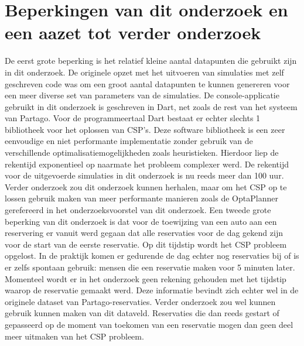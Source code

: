 \section{Beperkingen van dit onderzoek en een aazet tot verder onderzoek} \label{beperkingen-onderzoek}
De eerst grote beperking is het relatief kleine aantal datapunten die gebruikt zijn in dit onderzoek. De originele opzet met het uitvoeren van simulaties met zelf geschreven code was om een groot aantal datapunten te kunnen genereren voor een meer diverse set van parameters van de simulaties. De console-applicatie gebruikt in dit onderzoek is geschreven in Dart, net zoals de rest van het systeem van Partago. Voor de programmeertaal Dart bestaat er echter slechts 1 bibliotheek voor het oplossen van CSP's. Deze software bibliotheek is een zeer eenvoudige en niet performante implementatie zonder gebruik van de verschillende optimalisatiemogelijkheden zoals heuristieken. Hierdoor liep de rekentijd exponentieel op naarmate het probleem complexer werd. De rekentijd voor de uitgevoerde simulaties in dit onderzoek is nu reeds meer dan 100 uur. Verder onderzoek zou dit onderzoek kunnen herhalen, maar om het CSP op te lossen gebruik maken van meer performante manieren zoals de OptaPlanner gerefereerd in het onderzoeksvoorstel van dit onderzoek. 
Een tweede grote beperking van dit onderzoek is dat voor de toewijzing van een auto aan een reservering er vanuit werd gegaan dat alle reservaties voor de dag gekend zijn voor de start van de eerste reservatie. Op dit tijdstip wordt het CSP probleem opgelost. In de praktijk komen er gedurende de dag echter nog reservaties bij of is er zelfs spontaan gebruik: mensen die een reservatie maken voor 5 minuten later. Momenteel wordt er in het onderzoek geen rekening gehouden met het tijdstip waarop de reservatie gemaakt werd. Deze informatie bevindt zich echter wel in de originele dataset van Partago-reservaties. Verder onderzoek zou wel kunnen gebruik kunnen maken van dit dataveld. Reservaties die dan reeds gestart of gepasseerd op de moment van toekomen van een reservatie mogen dan geen deel meer uitmaken van het CSP probleem.    

